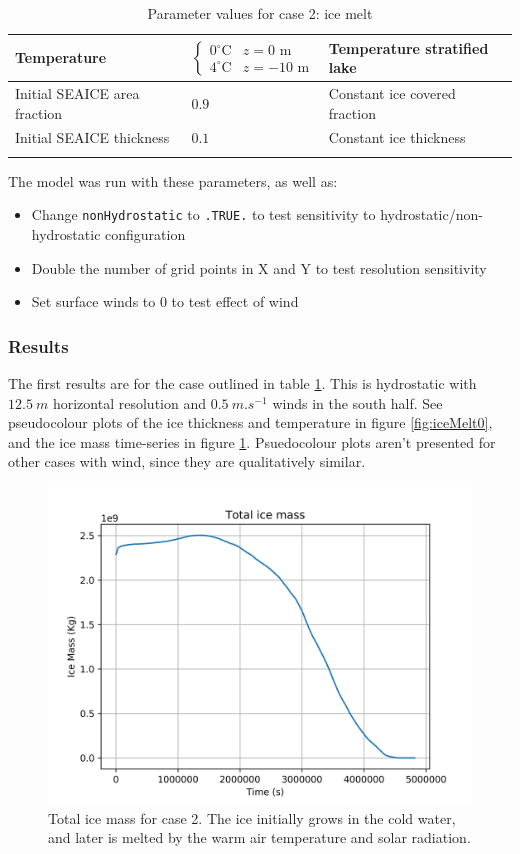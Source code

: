 \documentclass[11pt]{article}
\begin{document}
\begin{longtable}{  p{}  p{}  p{}  }
Temperature & \begin{equation*} \begin{cases} 0^{\circ} \text{C} & z = 0 \text{ m} \\ 4 ^{\circ} \text{C} & z = -10 \text{ m}   \end{cases} \end{equation*} & Temperature stratified lake \\ \hline
Initial SEAICE area fraction   & $0.9$ & Constant ice covered fraction \\ \hline
Initial SEAICE thickness    & $0.1$ & Constant ice thickness \\ \hline

\caption{Parameter values for case 2: ice melt}
\label{table:iceMelt}
\end{longtable}
The model was run with these parameters, as well as:
\begin{itemize}
\item{Change \verb|nonHydrostatic| to \verb|.TRUE.| to test sensitivity to hydrostatic/non-hydrostatic configuration}
\item{Double the number of grid points in X and Y to test resolution sensitivity}
\item{Set surface winds to 0 to test effect of wind}
\end{itemize}

\subsubsection{Results}
The first results are for the case outlined in table \ref{table:iceMelt}. This is hydrostatic with $\SI{12.5}{m}$ horizontal resolution and $\SI{0.5}{m.s^{-1}}$ winds in the south half. See pseudocolour plots of the ice thickness and temperature in figure \ref{fig:iceMelt0}, and the ice mass time-series in figure \ref{fig:iceMelt0IceMass}. Psuedocolour plots aren't presented for other cases with wind, since they are qualitatively similar.

\begin{figure}[h!]
\centering
\includegraphics[width=0.8\linewidth]{iceMelt/icemeltsmooth-icemass}
\caption{Total ice mass for case 2. The ice initially grows in the cold water, and later is melted by the warm air temperature and solar radiation.}
\label{fig:iceMelt0IceMass}
\end{figure}
\end{document}
